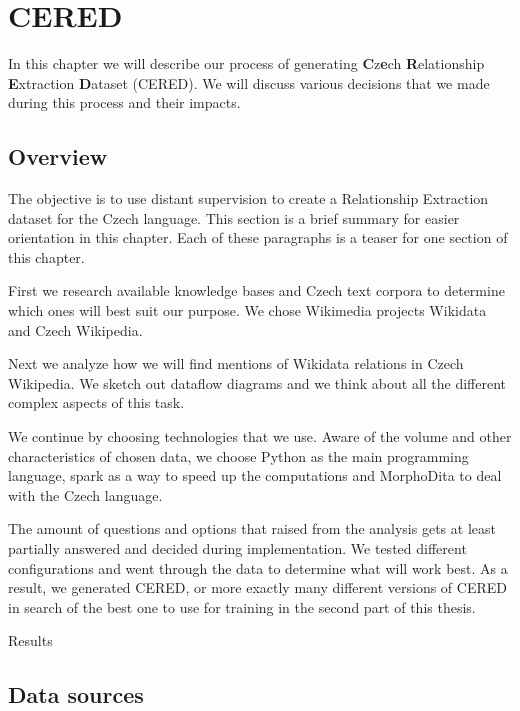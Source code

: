 \chapter{CERED}

In this chapter we will describe our process of generating \textbf{C}z\textbf{e}ch \textbf{R}elationship \textbf{E}xtraction \textbf{D}ataset (CERED). We will discuss various decisions that we made during this process and their impacts.




\section{Overview}

The objective is to use distant supervision to create a Relationship Extraction dataset for the Czech language. This section is a brief summary for easier orientation in this chapter. Each of these paragraphs is a teaser for one section of this chapter.

First we research available knowledge bases and Czech text corpora to determine which ones will best suit our purpose. We chose Wikimedia projects Wikidata and Czech Wikipedia.

Next we analyze how we will find mentions of Wikidata relations in Czech Wikipedia. We sketch out dataflow diagrams and we think about all the different complex aspects of this task.

We continue by choosing technologies that we use. Aware of the volume and other characteristics of chosen data, we choose Python as the main programming language, spark as a way to speed up the computations and MorphoDita to deal with the Czech language.

The amount of questions and options that raised from the analysis gets at least partially answered and decided during implementation. We tested different configurations and went through the data to determine what will work best. As a result, we generated CERED, or more exactly many different versions of CERED in search of the best one to use for training in the second part of this thesis. 

Results



\section{Data sources}

